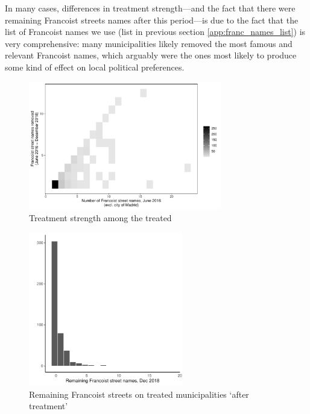 \documentclass[12pt, titlepage]{article}
\begin{document}
In many cases, differences in treatment strength---and the fact that there were remaining Francoist streets names after this period---is due to the fact that the list of Francoist names we use (list in previous section \ref{app:franc_names_list}) is very comprehensive: many municipalities likely removed the most famous and relevant Francoist names, which arguably were the ones most likely to produce some kind of effect on local political preferences.

\begin{figure}[htb!]
\centering

  \includegraphics[width = 0.75\textwidth]{img/trt_strength_st2016}

  \caption{Treatment strength among the treated}\label{fig:trt_strength_st2016}

\end{figure}

\begin{figure}[htb!]
\centering

  \includegraphics[width = 0.6\textwidth]{img/trt_remaining}

  \caption{Remaining Francoist streets on treated municipalities `after treatment'}\label{fig:trt_remaining}

\end{figure}
\end{document}
